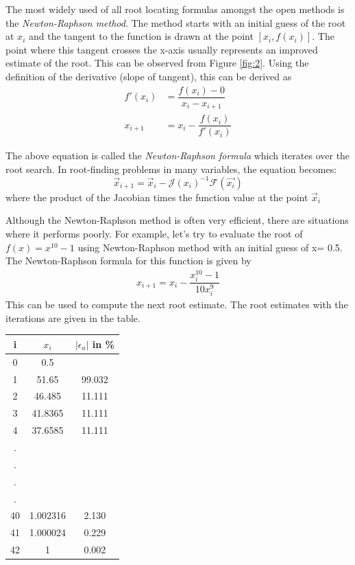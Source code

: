 \documentclass[book.tex]{subfiles}
\begin{document}
 The most widely used of all root locating formulas amongst the open methods is the \textit{Newton-Raphson method}. The method starts with an initial guess of the root at $x_i$ and the tangent to the function is drawn at the point $[x_i,f(x_i)]$. The point where this tangent crosses the x-axis usually represents an improved estimate of the root. This can be observed from Figure \ref{fig:2}.
Using the definition of the derivative (slope of tangent), this can be derived as 
\begin{align}
f'(x_i) &= \dfrac{f(x_i) - 0}{x_i - x_{i+1}} \\
x_{i+1} &= x_i - \dfrac{f(x_i)}{f'(x_i)}
\end{align}

The above equation is called the \textit{Newton-Raphson formula} which iterates over the root search.  In root-finding problems in many variables, the equation becomes:
 \begin{equation*}
 \vec{x}_{i+1} = \vec{x}_i - \mathcal{J}(x_i)^{-1} \mathcal{F}(\vec{x_i})
 \end{equation*}
where the product of the Jacobian times the function value at the point $\vec{x}_i$

Although the Newton-Raphson method is often very efficient, there are situations where it performs poorly. For example, let's try to evaluate the root of $f(x) = x^{10} - 1$ using Newton-Raphson method with an initial guess of  x= 0.5. The Newton-Raphson formula for this function is given by
 \begin{align}
 x_{i+1} = x_i - \dfrac{x_i^{10} - 1}{10x_i^9}
 \end{align}
 This can be used to compute the next root estimate. The root estimates with the iterations are given in the table.
 
\begin{margintable}
\caption{Iterations for the Newton-Raphson method ($f=x^{10}-1$)}
	\begin{tabular}{|c|c|c|}
	\hline
\textbf{i} & \textbf{$x_i$} &\textbf{ $|\epsilon_a|$ in \%} \\ \hline
0 & 0.5 &  \\
1 & 51.65 & 99.032 \\
2 & 46.485 & 11.111 \\
3 & 41.8365 & 11.111 \\ 
4 & 37.6585 & 11.111 \\ 
. & & \\
. & & \\
. & & \\
. & & \\
40 & 1.002316 & 2.130\\
41 & 1.000024 & 0.229\\
42 & 1 & 0.002\\
\hline
    \end{tabular}
\end{margintable}
\end{document}
